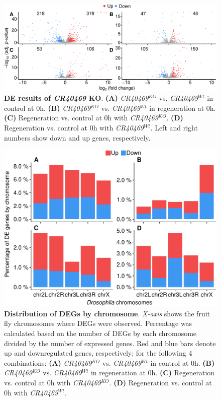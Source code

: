 \begin{figure}[ht!]
  \centering
  \includegraphics[scale=0.65]{plots/results/dme/volcano.plots.pdf}
  \caption[DE results of \textit{CR40469} KO]{\textbf{DE results of \textit{CR40469} KO}. \textbf{(A)} \textit{CR40469}$^{KO}$ vs. \textit{CR40469}$^{Wt}$ in control at 0h. \textbf{(B)} \textit{CR40469}$^{KO}$ vs. \textit{CR40469}$^{Wt}$ in regeneration at 0h. \textbf{(C)} Regeneration vs. control at 0h with \textit{CR40469}$^{KO}$. \textbf{(D)} Regeneration vs. control at 0h with \textit{CR40469}$^{Wt}$. Left and right numbers show down and up genes, respectively.}
  \label{fig:cr40469-volcano-plots}
\end{figure}

\begin{figure}[ht!]
  \centering
  \includegraphics[scale=0.5]{plots/appendix/dme/cis.acting.cr40469.pdf}
  \caption[Distribution of DEGs by chromosome]{\textbf{Distribution of DEGs by chromosome}.  \textit{X-axis} shows the fruit fly chromosomes where DEGs were observed. Percentage  was calculated based on the number of DEGs by each chromosome divided by the number of expressed genes. Red and blue bars denote up and downregulated genes, respectively; for the following 4 combinations: \textbf{(A)} \textit{CR40469}$^{KO}$ vs. \textit{CR40469}$^{Wt}$ in control at 0h. \textbf{(B)} \textit{CR40469}$^{KO}$ vs. \textit{CR40469}$^{Wt}$ in regeneration at 0h. \textbf{(C)} Regeneration vs. control at 0h with \textit{CR40469}$^{KO}$. \textbf{(D)} Regeneration vs. control at 0h with \textit{CR40469}$^{Wt}$.}
  \label{supp-fig:cr40469-cis-acting}
\end{figure}

